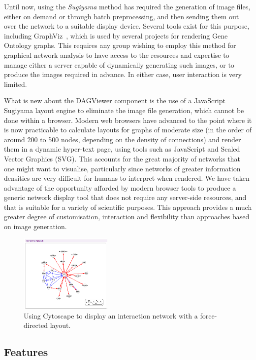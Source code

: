 \documentclass[10pt,a4paper,twocolumn]{article}
\begin{document}
Until now, using the \emph{Sugiyama} method has required the generation of image
files, either on demand or through batch preprocessing, and then sending them
out over the network to a suitable display device. Several tools exist for this
purpose, including GraphViz~\cite{graphviz}, which is used by several projects
for rendering Gene Ontology graphs. This requires any group wishing to employ
this method for graphical network analysis to have access to the resources and
expertise to manage either a server capable of dynamically generating such
images, or to produce the images required in advance. In either case, user
interaction is very limited.

What is new about the DAGViewer component is the use of a JavaScript Sugiyama
layout engine to eliminate the image file generation, which cannot be done
within a browser. Modern web browsers have advanced to the point where it is now
practicable to calculate layouts for graphs of moderate size (in the order of
around 200 to 500 nodes, depending on the density of connections) and render
them in a dynamic hyper-text page, using tools such as JavaScript and Scaled
Vector Graphics (SVG). This accounts for the great majority of networks that one
might want to visualise, particularly since networks of greater information
densities are very difficult for humans to interpret when rendered. We have
taken advantage of the opportunity afforded by modern browser tools to produce a
generic network display tool that does not require any server-side resources,
and that is suitable for a variety of scientific purposes. This approach
provides a much greater degree of customisation, interaction and flexibility
than approaches based on image generation.

\begin{figure}[htb]
\centering
\includegraphics[width=0.4\textwidth]{force-directed.png}
\caption{
    \label{fig:force-directed}
    Using Cytoscape to display an interaction network with a force-directed layout.
}
\end{figure}

\subsection*{Features}
\end{document}
